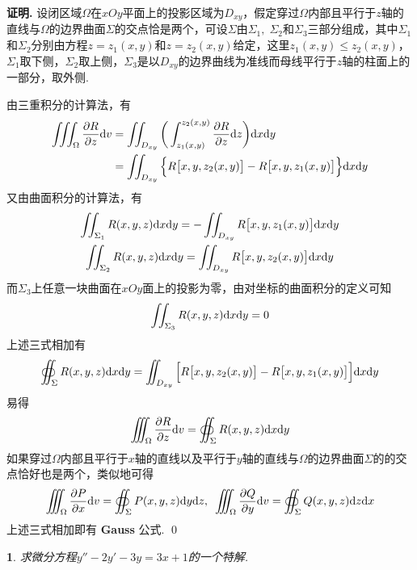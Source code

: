 \documentclass[12pt, a4paper, oneside]{ctexbook}
\newtheorem{example}{\color{SeaGreen}{例}}  %
\renewenvironment{proof}{\par\textbf{证明.}\;}{\qed\par}
\def\d{\textup{d}} %
\def\d{\textup{d}} %
\begin{document}
        \begin{proof}
            设闭区域$\Omega$在$xOy$平面上的投影区域为$D_{xy}$，假定穿过$\Omega$内部且平行于$z$轴的直线与$\Omega$的边界曲面$\Sigma$的交点恰是两个，可设$\Sigma$由$\Sigma_1,\;\Sigma_2$和$\Sigma_3$三部分组成，其中$\Sigma_1$和$\Sigma_2$分别由方程$z = z_1(x,y)$和$z = z_2(x,y)$给定，这里$z_1(x,y) \le z_2(x,y)$，$\Sigma_1$取下侧，$\Sigma_2$取上侧，$\Sigma_3$是以$D_{xy}$的边界曲线为准线而母线平行于$z$轴的柱面上的一部分，取外侧.
        
            由三重积分的计算法，有
            \begin{align*}
                \iiint_{\Omega}\frac{\partial R}{\partial z}\d v & = \iint_{D_{xy}}\bigg(\int_{z_1(x,y)}^{z_2(x,y)} \frac{\partial R}{\partial z}\d z\bigg) \d x\d y \\
                                                                 & =\iint_{D_{xy}}\Big\{R\big[x,y,z_2(x,y)\big]-R\big[x,y,z_1(x,y)\big]\Big\}\d x\d y
            \end{align*}
            又由曲面积分的计算法，有
            \begin{gather*}
                \iint_{\Sigma_1}R(x,y,z)\d x\d y = -\iint_{D_{xy}}R\big[x,y,z_1(x,y) \big]\d x\d y \\
                \iint_{\Sigma_2}R(x,y,z)\d x\d y = \iint_{D_{xy}}R\big[x,y,z_2(x,y) \big]\d x\d y
            \end{gather*}
            而$\Sigma_3$上任意一块曲面在$xOy$面上的投影为零，由对坐标的曲面积分的定义可知
            \[
                \iint_{\Sigma_3}R(x,y,z)\d x\d y = 0
            \]
            上述三式相加有
            \[
                \oiint_{\Sigma}R(x,y,z)\d x\d y = \iint_{D_{xy}}\Big[R\big[x,y,z_2(x,y)\big]-R\big[x,y,z_1(x,y)\big]\Big]\d x\d y
            \]
            易得
            \[
                \iiint_{\Omega}\frac{\partial R}{\partial z}\d v = \oiint_{\Sigma}R(x,y,z)\d x\d y
            \]
            如果穿过$\Omega$内部且平行于$x$轴的直线以及平行于$y$轴的直线与$\Omega$的边界曲面$\Sigma$的的交点恰好也是两个，类似地可得
            \[
                \iiint_{\Omega}\frac{\partial P}{\partial x}\d v = \oiint_{\Sigma}P(x,y,z)\d y\d z,\enspace \iiint_{\Omega}\frac{\partial Q}{\partial y}\d v = \oiint_{\Sigma}Q(x,y,z)\d z\d x
            \]
            上述三式相加即有 \textbf{Gauss} 公式.
        \end{proof}

        \begin{example}
            求微分方程$y''-2y'-3y=3x+1$的一个特解.
        \end{example}
\end{document}
